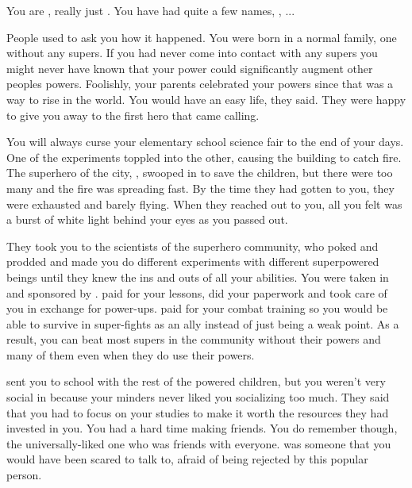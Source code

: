 \documentclass[char]{LRSguildcamp1}
\begin{document}
\name{\cYS{}}

You are \cYS{}, really just \cYS{\intro}. You have had quite a few names, \cYSOldName{}, \cYS{\MYsupername}...

People used to ask you how it happened. You were born in a normal family, one without any supers. If you had never come into contact with any supers you might never have known that your power could significantly augment other peoples powers. Foolishly, your parents celebrated your powers since that was a way to rise in the world. You would have an easy life, they said. They were happy to give you away to the first hero that came calling. 

You will always curse your elementary school science fair to the end of your days. One of the experiments toppled into the other, causing the building to catch fire. The superhero of the city, \cEther{}, swooped in to save the children, but there were too many and the fire was spreading fast. By the time they had gotten to you, they were exhausted and barely flying. When they reached out to you, all you felt was a burst of white light behind your eyes as you passed out. 

They took you to the scientists of the superhero community, who poked and prodded and made you do different experiments with different superpowered beings until they knew the ins and outs of all your abilities. You were taken in and sponsored by \cEther{\them}. \cEther{\They} paid for your lessons, did your paperwork and took care of you in exchange for power-ups. \cEther{\They} paid for your combat training so you would be able to survive in super-fights as an ally instead of just being a weak point. As a result, you can beat most supers in the community without their powers and many of them even when they do use their powers. 

\cEther{\They} sent you to school with the rest of the powered children, but you weren't very social in \pSuperSchool{} because your minders never liked you socializing too much. They said that you had to focus on your studies to make it worth the resources they had invested in you. You had a hard time making friends. You do remember \cYoungest{} though, the universally-liked one who was friends with everyone. \cYoungest{} was someone that you would have been scared to talk to, afraid of being rejected by this popular person.  
\end{document}
